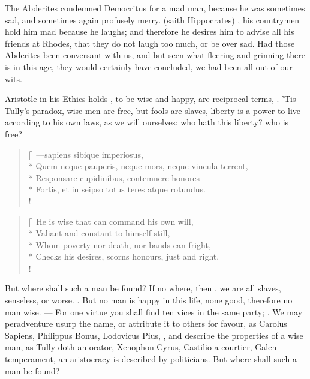 {The Abderites condemned Democritus for a mad man, because he was
sometimes sad, and sometimes again profusely merry.  (saith
Hippocrates) , his countrymen hold
him mad because he laughs; and therefore he desires him to advise
all his friends at Rhodes, that they do not laugh too much, or be over
sad. Had those Abderites been conversant with us, and but seen what
 fleering and grinning there is in this age, they would certainly
have concluded, we had been all out of our wits.

Aristotle in his Ethics holds , to be wise and
happy, are reciprocal terms, . 'Tis 
Tully's paradox, wise men are free, but fools are slaves, liberty is a
power to live according to his own laws, as we will ourselves: who hath
this liberty? who is free?

\settowidth{\versewidth}{Quem neque pauperis, neque mors, neque vincula terrent,}
\begin{verse}[\versewidth]
---\textlatin{sapiens sibique imperiosus,}\\*
\textlatin{Quem neque pauperis, neque mors, neque vincula terrent,}\\*
\textlatin{Responsare cupidinibus, contemnere honores}\\*
\textlatin{Fortis, et in seipso totus teres atque rotundus.}\\!
\end{verse}

\settowidth{\versewidth}{Checks his desires, scorns honours, just and right.}
\begin{verse}[\versewidth]
He is wise that can command his own will,\\*
Valiant and constant to himself still,\\*
Whom poverty nor death, nor bands can fright,\\*
Checks his desires, scorns honours, just and right.\\!
\end{verse}

But where shall such a man be found? If no where, then , we
are all slaves, senseless, or worse. . But no man is
happy in this life, none good, therefore no man wise. --- For one virtue you shall find ten vices in the same party;
. We may peradventure usurp the name,
or attribute it to others for favour, as Carolus Sapiens, Philippus
Bonus, Lodovicus Pius, \etc{}, and describe the properties of a wise man,
as Tully doth an orator, Xenophon Cyrus, Castilio a courtier, Galen
temperament, an aristocracy is described by politicians. But where
shall such a man be found?

}
